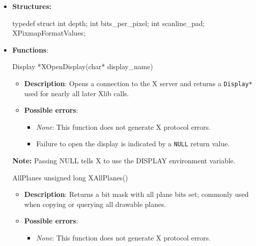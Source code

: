 \documentclass{report}
\begin{document}
    \pagebreak 
    \begin{itemize}
        \item \textbf{Structures:} 
            \begin{cppcode}
                typedef struct {
                    int depth;
                    int bits_per_pixel;
                    int scanline_pad;
                } XPixmapFormatValues;
            \end{cppcode}

    \item \textbf{Functions}:
        \begin{cppcode}
            Display *XOpenDisplay(char* display_name)
        \end{cppcode}
        \begin{itemize}
            \item \textbf{Description}: Opens a connection to the X server and returns a \texttt{Display*} used for nearly all later Xlib calls.
            \item \textbf{Possible errors}:
                \begin{itemize}
                    \item \textit{None}: This function does not generate X protocol errors.
                    \item Failure to open the display is indicated by a \texttt{NULL} return value.
                \end{itemize}
        \end{itemize}
        \textbf{Note:} Passing NULL tells X to use the DISPLAY environment variable.

        \begin{cppcode}
            AllPlanes
            unsigned long XAllPlanes()
        \end{cppcode}
        \begin{itemize}
            \item \textbf{Description}: Returns a bit mask with all plane bits set; commonly used when copying or querying all drawable planes.
            \item \textbf{Possible errors}:
                \begin{itemize}
                    \item \textit{None}: This function does not generate X protocol errors.
                \end{itemize}
        \end{itemize}


\end{itemize}
\end{document}
